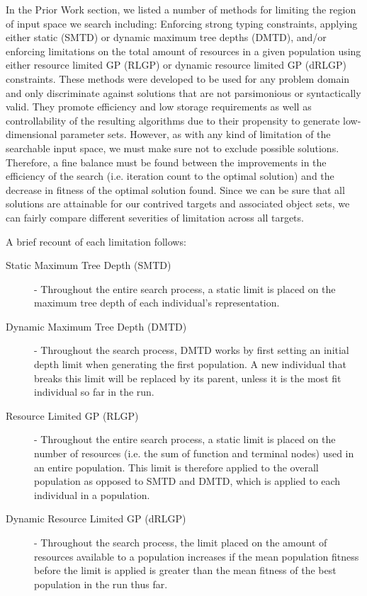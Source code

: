 \documentclass[a4paper,12pt]{report} 	%
\numberwithin{figure}{chapter}
\numberwithin{table}{chapter}
\numberwithin{equation}{chapter}
\begin{document}
\begin{flushleft}
In the Prior Work section, we listed a number of methods for limiting the region of input space we search including: Enforcing strong typing constraints, applying either static (SMTD) or dynamic maximum tree depths (DMTD), and/or enforcing limitations on the total amount of resources in a given population using either resource limited GP (RLGP) or dynamic resource limited GP (dRLGP) constraints. These methods were developed to be used for any problem domain and only discriminate against solutions that are not parsimonious or syntactically valid. They promote efficiency and low storage requirements as well as controllability of the resulting algorithms due to their propensity to generate low-dimensional parameter sets. However, as with any kind of limitation of the searchable input space, we must make sure not to exclude possible solutions. Therefore, a fine balance must be found between the improvements in the efficiency of the search (i.e. iteration count to the optimal solution) and the decrease in fitness of the optimal solution found. Since we can be sure that all solutions are attainable for our contrived targets and associated object sets, we can fairly compare different severities of limitation across all targets.

A brief recount of each limitation follows:

\begin{description}
\item [Static Maximum Tree Depth (SMTD)] - Throughout the entire search process, a static limit is placed on the maximum tree depth of each individual's representation.
\item [Dynamic Maximum Tree Depth (DMTD)] - Throughout the search process, DMTD works by first setting an initial depth limit when generating the first population. A new individual that breaks this limit will be replaced by its parent, unless it is the most fit individual so far in the run.\item [Resource Limited GP (RLGP)] - Throughout the entire search process, a static limit is placed on the number of resources (i.e. the sum of function and terminal nodes) used in an entire population. This limit is therefore applied to the overall population as opposed to SMTD and DMTD, which is applied to each individual in a population.
\item [Dynamic Resource Limited GP (dRLGP)] - Throughout the search process, the limit placed on the amount of resources available to a population increases if the mean population fitness before the limit is applied is greater than the mean fitness of the best population in the run thus far.
\end{description}


\end{flushleft}
\end{document}
